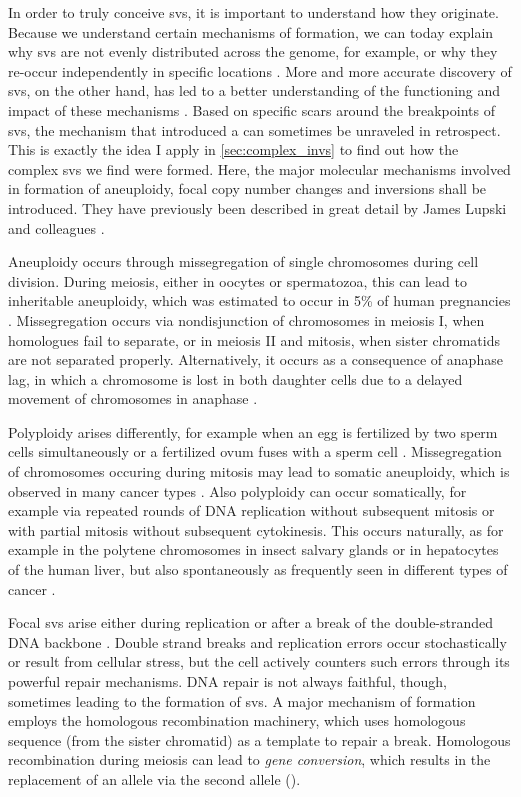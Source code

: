 In order to truly conceive \aclp{sv}, it is important to understand how they
originate. Because we understand certain mechanisms of formation, we
can today explain why \acp{sv} are not evenly distributed across the genome, for example, or
why they re-occur independently in specific locations \citep{Hastings2009}.
More and more accurate discovery of \acp{sv}, on the other hand, has led to
a better understanding of the functioning and impact of these mechanisms
\citep{Hastings2009,Abyzov2015}. Based on specific scars around the breakpoints
of \acp{sv}, the mechanism that introduced a \sv can sometimes be unraveled in
retrospect. This is exactly the idea I apply in \cref{sec:complex_invs} to find
out how the complex \acp{sv} we find were formed. Here, the major molecular
mechanisms involved in formation of aneuploidy, focal copy number changes and
inversions shall be introduced. They have previously been described in
great detail by James Lupski and colleagues \citep{Hastings2009,Carvalho2016}.

Aneuploidy occurs through missegregation of single chromosomes during cell
division. During meiosis, either in oocytes or spermatozoa, this can lead to
inheritable aneuploidy, which was estimated to occur in 5\% of human pregnancies
\citep{Templado2013}. Missegregation occurs via nondisjunction of chromosomes in
meiosis I, when homologues fail to separate, or in meiosis II and mitosis, when
sister chromatids are not separated properly. Alternatively, it occurs as a
consequence of anaphase lag, in which a chromosome is lost in both daughter
cells due to a delayed movement of chromosomes in anaphase \citep{webAneuploidy}.

Polyploidy arises differently, for example when an egg is fertilized by two
sperm cells simultaneously or a fertilized ovum fuses with a sperm cell
\citep{webAneuploidy}. Missegregation of chromosomes occuring during mitosis may
lead to somatic aneuploidy, which is observed in many cancer types
\citep{Gordon2012}. Also polyploidy can occur somatically, for example via
repeated rounds of DNA replication without subsequent mitosis or with partial
mitosis without subsequent cytokinesis. This occurs naturally, as for example
in the polytene chromosomes in insect salvary glands or in hepatocytes of the
human liver, but also spontaneously as frequently seen in different types of
cancer \citep{Davoli2011}.

Focal \acp{sv} arise either during replication or after a break of the
double-stranded DNA backbone \citep{Hastings2009}. Double strand breaks and
replication errors occur stochastically or result from cellular stress, but the
cell actively counters such errors through its powerful repair mechanisms. DNA
repair is not always faithful, though, sometimes leading to the formation of
\acp{sv}. A major mechanism of \sv formation employs the homologous
recombination machinery, which uses homologous sequence (from the sister
chromatid) as a template to repair a break. Homologous recombination during
meiosis can lead to \emph{gene conversion}, which results in the replacement of
an allele via the second allele (\loh).

